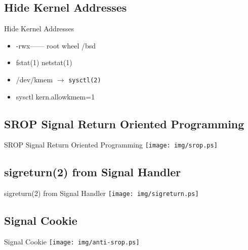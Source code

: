 \documentclass[14pt]{beamer}
\begin{document}
\subsection{Hide Kernel Addresses}
\begin{frame}{Hide Kernel Addresses}
\begin{itemize}
    \item -rwx------ root wheel /bsd
    \item fstat(1) netstat(1)
    \item /dev/kmem $\rightarrow$ \texttt{sysctl(2)}
    \item sysctl kern.allowkmem=1
\end{itemize}
\end{frame}

\subsection{SROP Signal Return Oriented Programming}
\begin{frame}{SROP Signal Return Oriented Programming}
\texttt{[image: img/srop.ps]}
\end{frame}

\subsection{sigreturn(2) from Signal Handler}
\begin{frame}{sigreturn(2) from Signal Handler}
\texttt{[image: img/sigreturn.ps]}
\end{frame}

\subsection{Signal Cookie}
\begin{frame}{Signal Cookie}
\texttt{[image: img/anti-srop.ps]}
\end{frame}
\end{document}
